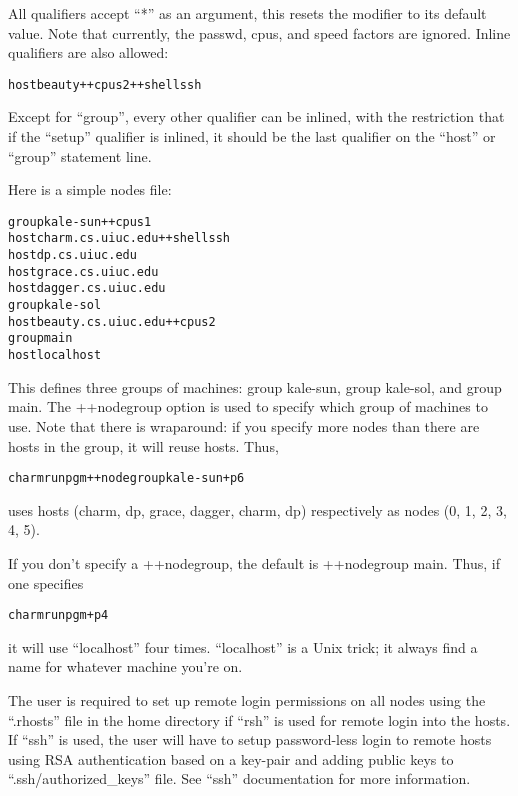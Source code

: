 All qualifiers accept ``*'' as an argument, this resets the modifier to
its default value.  Note that currently, the passwd, cpus, and speed
factors are ignored.  Inline qualifiers are also allowed:

\begin{alltt}
host beauty ++cpus 2 ++shell ssh
\end{alltt}

Except for ``group'', every other qualifier can be inlined, with the
restriction that if the ``setup'' qualifier is inlined, it should be
the last qualifier on the ``host'' or ``group'' statement line.

Here is a simple nodes file:

\begin{alltt}
        group kale-sun ++cpus 1
          host charm.cs.uiuc.edu ++shell ssh
          host dp.cs.uiuc.edu
          host grace.cs.uiuc.edu
          host dagger.cs.uiuc.edu
        group kale-sol
          host beauty.cs.uiuc.edu ++cpus 2
        group main
          host localhost
\end{alltt}

This defines three groups of machines: group kale-sun, group kale-sol,
and group main.  The ++nodegroup option is used to specify which group
of machines to use.  Note that there is wraparound: if you specify
more nodes than there are hosts in the group, it will reuse
hosts. Thus,

\begin{alltt}
        charmrun pgm ++nodegroup kale-sun +p6
\end{alltt}

uses hosts (charm, dp, grace, dagger, charm, dp) respectively as
nodes (0, 1, 2, 3, 4, 5).

If you don't specify a ++nodegroup, the default is ++nodegroup main.
Thus, if one specifies

\begin{alltt}
        charmrun pgm +p4
\end{alltt}

it will use ``localhost'' four times.  ``localhost'' is a Unix
trick; it always find a name for whatever machine you're on.

The user is required to set up remote login permissions on all nodes
using the ``.rhosts'' file in the home directory if ``rsh'' is used for remote
login into the hosts. If ``ssh'' is used, the user will have to setup
password-less login to remote hosts using
RSA authentication based on a key-pair and adding public keys to 
``.ssh/authorized\_keys'' file. See ``ssh'' documentation for more information.

